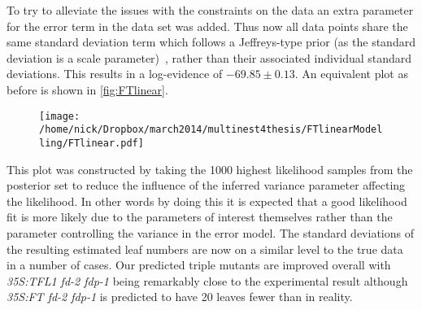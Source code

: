 To try to alleviate the issues with the constraints on the data an extra parameter for the error term in the data set was added.
Thus now all data points share the same standard deviation term which follows a Jeffreys-type prior (as the standard deviation is a scale parameter)~\cite{jeffreys1961}, rather than their associated individual standard deviations.
This results in a log-evidence of $-69.85\pm 0.13$.
An equivalent plot as before is shown in \autoref{fig:FTlinear}.
\begin{figure}[!htbp]
\centering
\texttt{[image: /home/nick/Dropbox/march2014/multinest4thesis/FTlinearModelling/FTlinear.pdf]}
\end{figure}
This plot was constructed by taking the 1000 highest likelihood samples from the posterior set to reduce the influence of the inferred variance parameter affecting the likelihood.
In other words by doing this it is expected that a good likelihood fit is more likely due to the parameters of interest themselves rather than the parameter controlling the variance in the error model.
The standard deviations of the resulting estimated leaf numbers are now on a similar level to the true data in a number of cases.
Our predicted triple mutants are improved overall with \emph{35S:TFL1 fd-2 fdp-1} being remarkably close to the experimental result although \emph{35S:FT fd-2 fdp-1} is predicted to have 20 leaves fewer than in reality.


